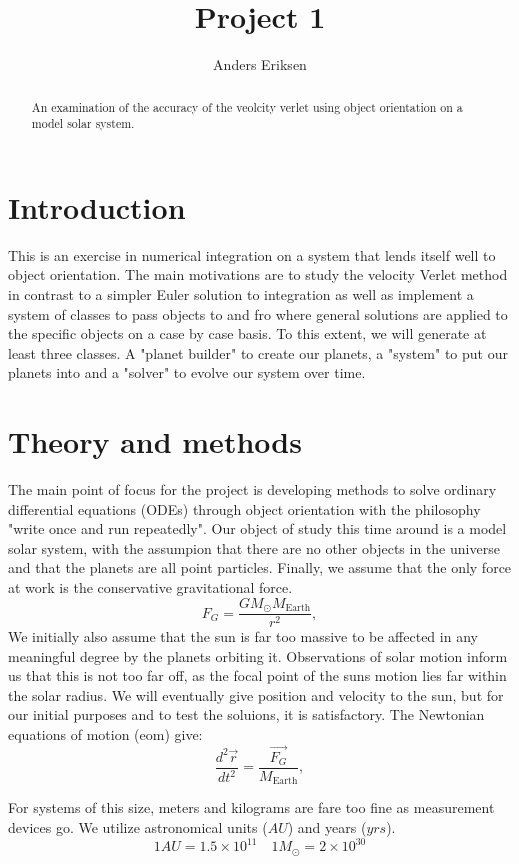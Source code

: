 \documentclass[10pt, twocolumn]{revtex4-1}
\begin{document}
\title{Project 1}
\author{Anders Eriksen}
\begin{abstract}
    An examination of the accuracy of the veolcity verlet using object orientation on a model
    solar system. 
\end{abstract}
\maketitle


\section{Introduction}
This is an exercise in numerical integration on a system that lends itself well to object orientation. 
The main motivations are to study the velocity Verlet method in contrast to a simpler Euler solution 
to integration as well as implement a system of classes to pass objects to and fro where general 
solutions are applied to the specific objects on a case by case basis. To this extent, we will generate
at least three classes. A "planet builder" to create our planets, a "system" to put our planets into and
a "solver" to evolve our system over time. 

\section{Theory and methods}

The main point of focus for the project is developing methods to
solve ordinary differential equations (ODEs) through object orientation with the philosophy "write once and run repeatedly".
Our object of study this time around is a model solar system, with the assumpion that there are no other objects in the universe
and that the planets are all point particles. Finally, we assume that the only force at work is the conservative gravitational force. 
\[
F_G=\frac{GM_{\odot}M_{\mathrm{Earth}}}{r^2},
\]
We initially also assume that the sun is far too massive to be affected in any meaningful degree by the planets orbiting it. 
Observations of solar motion inform us that this is not too far off, as the focal point of the suns motion lies far within the 
solar radius. We will eventually give position and velocity to the sun, but for our initial purposes and to test the soluions, it 
is satisfactory. The Newtonian equations of motion (eom) give: 
\[
    \frac{d^2\vec{r}}{dt^2}=\frac{\vec{F_{G}}}{M_{\mathrm{Earth}}},
\]

For systems of this size, meters and kilograms are fare too fine as measurement devices go. We utilize astronomical units ($AU$)
and years ($yrs$). 
\[
    1 AU = 1.5\times 10^{11} \quad 1 M_{\odot} = 2\times 10^{30}
\]
\end{document}

